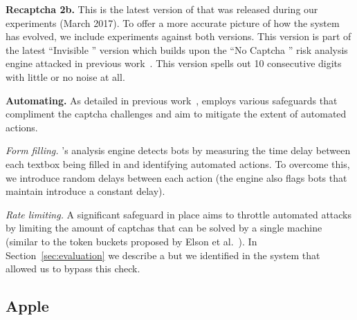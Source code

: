 \textbf{Recaptcha 2b.} This is the latest version of \re that was released during our experiments (March 2017). 
To offer a more accurate picture of how the system has evolved, we include experiments against both versions.
This version is part of the latest ``Invisible \re'' version which builds upon the ``No Captcha \re'' risk analysis engine attacked in 
previous work~\cite{sivakorn:eurosp16}. This version spells out 10 consecutive digits with little or no noise at all.


\textbf{Automating.} As detailed in previous work~\cite{sivakorn:eurosp16}, \re employs various
safeguards that compliment the captcha challenges and aim to mitigate the extent of automated 
actions.

\emph{Form filling.} \re's analysis engine detects bots by measuring the time delay between
each textbox being filled in and identifying automated actions. To overcome this, we introduce 
random delays between each action (the engine also flags bots that maintain introduce a constant delay).

\emph{Rate limiting.} A significant safeguard in place aims to throttle automated attacks by limiting 
the amount of captchas that can be solved by a single machine (similar to the token buckets proposed by 
Elson et al.~\cite{asirra}). In Section~\ref{sec:evaluation} we describe a but we identified in the system
that allowed us to bypass this check.

\subsection{Apple}

